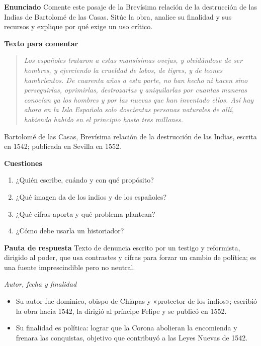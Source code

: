 \documentclass{book}
\begin{document}
\begin{tcolorbox}[title={Ejercicio resuelto}, studiumworked, breakable]

\noindent\textbf{Enunciado}
Comente este pasaje de la Brevísima relación de la destrucción de las Indias de Bartolomé de las Casas. Sitúe la obra, analice su finalidad y sus recursos y explique por qué exige un uso crítico.


\noindent\textbf{Texto para comentar}

\begin{quote}
\itshape Los españoles trataron a estas mansísimas ovejas, y olvidándose de ser hombres, y ejerciendo la crueldad de lobos, de tigres, y de leones hambrientos. De cuarenta años a esta parte, no han hecho ni hacen sino perseguirlas, oprimirlas, destrozarlas y aniquilarlas por cuantas maneras conocían ya los hombres y por las nuevas que han inventado ellos. Así hay ahora en la Isla Española solo doscientas personas naturales de allí, habiendo habido en el principio hasta tres millones.
\end{quote}
{\noindent\footnotesize Bartolomé de las Casas, Brevísima relación de la destrucción de las Indias, escrita en 1542; publicada en Sevilla en 1552.\par}

\noindent\textbf{Cuestiones}
\begin{enumerate}
\item ¿Quién escribe, cuándo y con qué propósito?
\item ¿Qué imagen da de los indios y de los españoles?
\item ¿Qué cifras aporta y qué problema plantean?
\item ¿Cómo debe usarla un historiador?
\end{enumerate}

\noindent\textbf{Pauta de respuesta}
Texto de denuncia escrito por un testigo y reformista, dirigido al poder, que usa contrastes y cifras para forzar un cambio de política; es una fuente imprescindible pero no neutral.


\noindent\textit{Autor, fecha y finalidad}
\begin{itemize}
\item Su autor fue dominico, obispo de Chiapas y «protector de los indios»; escribió la obra hacia 1542, la dirigió al príncipe Felipe y se publicó en 1552.
\item Su finalidad es política: lograr que la Corona abolieran la encomienda y frenara las conquistas, objetivo que contribuyó a las Leyes Nuevas de 1542.
\end{itemize}


\end{tcolorbox}
\end{document}
